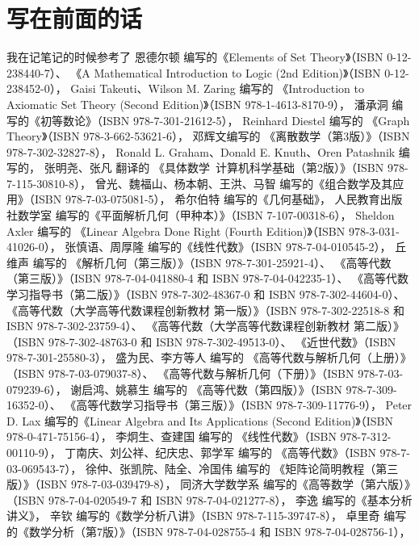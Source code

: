\chapter*{写在前面的话}
我在记笔记的时候参考了
恩德尔顿 编写的《Elements of Set Theory》（ISBN 0-12-238440-7）、
《A Mathematical Introduction to Logic (2nd Edition)》（ISBN 0-12-238452-0），
Gaisi Takeuti、Wilson M. Zaring 编写的
《Introduction to Axiomatic Set Theory (Second Edition)》（ISBN 978-1-4613-8170-9），
潘承洞 编写的《初等数论》（ISBN 978-7-301-21612-5），
Reinhard Diestel 编写的
《Graph Theory》（ISBN 978-3-662-53621-6），
邓辉文编写的
《离散数学（第3版）》（ISBN 978-7-302-32827-8），
Ronald L. Graham、Donald E. Knuth、Oren Patashnik 编写的，
张明尧、张凡 翻译的
《具体数学\ 计算机科学基础（第2版）》（ISBN 978-7-115-30810-8），
曾光、魏福山、杨本朝、王洪、马智 编写的《组合数学及其应用》（ISBN 978-7-03-075081-5），
希尔伯特 编写的《几何基础》，
人民教育出版社数学室 编写的《平面解析几何（甲种本）》（ISBN 7-107-00318-6），
Sheldon Axler 编写的
《Linear Algebra Done Right (Fourth Edition)》（ISBN 978-3-031-41026-0），
张慎语、周厚隆 编写的《线性代数》（ISBN 978-7-04-010545-2），
丘维声 编写的
《解析几何（第三版）》（ISBN 978-7-301-25921-4）、
《高等代数（第三版）》（ISBN 978-7-04-041880-4 和 ISBN 978-7-04-042235-1）、
《高等代数学习指导书（第二版）》（ISBN 978-7-302-48367-0 和 ISBN 978-7-302-44604-0）、
《高等代数（大学高等代数课程创新教材 第一版）》（ISBN 978-7-302-22518-8 和 ISBN 978-7-302-23759-4）、
《高等代数（大学高等代数课程创新教材 第二版）》（ISBN 978-7-302-48763-0 和 ISBN 978-7-302-49513-0）、
《近世代数》（ISBN 978-7-301-25580-3），
盛为民、李方等人 编写的
《高等代数与解析几何（上册）》（ISBN 978-7-03-079037-8）、
《高等代数与解析几何（下册）》（ISBN 978-7-03-079239-6），
谢启鸿、姚慕生 编写的
《高等代数（第四版）》（ISBN 978-7-309-16352-0）、
《高等代数学习指导书（第三版）》（ISBN 978-7-309-11776-9），
Peter D. Lax 编写的《Linear Algebra and Its Applications (Second Edition)》（ISBN 978-0-471-75156-4），
李炯生、查建国 编写的
《线性代数》（ISBN 978-7-312-00110-9），
丁南庆、刘公祥、纪庆忠、郭学军 编写的
《高等代数》（ISBN 978-7-03-069543-7），
徐仲、张凯院、陆全、冷国伟 编写的
《矩阵论简明教程（第三版）》（ISBN 978-7-03-039479-8），
同济大学数学系 编写的《高等数学（第六版）》（ISBN 978-7-04-020549-7 和 ISBN 978-7-04-021277-8），
李逸 编写的《基本分析讲义》，
辛钦 编写的《数学分析八讲》（ISBN 978-7-115-39747-8），
卓里奇 编写的《数学分析（第7版）》（ISBN 978-7-04-028755-4 和 ISBN 978-7-04-028756-1），
